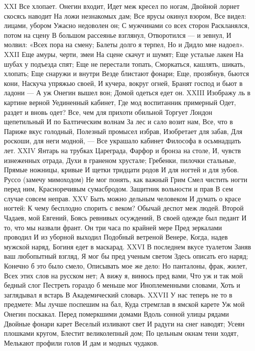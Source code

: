 XXI
Все хлопает. Онегин входит,
Идет меж кресел по ногам,
Двойной лорнет скосясь наводит
На ложи незнакомых дам;
Все ярусы окинул взором,
Все видел: лицами, убором
Ужасно недоволен он;
С мужчинами со всех сторон
Раскланялся, потом на сцену
В большом рассеянье взглянул,
Отворотился — и зевнул,
И молвил: «Всех пора на смену;
Балеты долго я терпел,
Но и Дидло мне надоел».
XXII
Еще амуры, черти, змеи
На сцене скачут и шумят;
Еще усталые лакеи
На шубах у подъезда спят;
Еще не перестали топать,
Сморкаться, кашлять, шикать, хлопать;
Еще снаружи и внутри
Везде блистают фонари;
Еще, прозябнув, бьются кони,
Наскуча упряжью своей,
И кучера, вокруг огней,
Бранят господ и бьют в ладони —
А уж Онегин вышел вон;
Домой одеться едет он.
XXIII
Изображу ль в картине верной
Уединенный кабинет,
Где мод воспитанник примерный
Одет, раздет и вновь одет?
Все, чем для прихоти обильной
Торгует Лондон щепетильный
И по Балтическим волнам
За лес и сало возит нам,
Все, что в Париже вкус голодный,
Полезный промысел избрав,
Изобретает для забав,
Для роскоши, для неги модной, —
Все украшало кабинет
Философа в осьмнадцать лет.
XXIV
Янтарь на трубках Цареграда,
Фарфор и бронза на столе,
И, чувств изнеженных отрада,
Духи в граненом хрустале;
Гребенки, пилочки стальные,
Прямые ножницы, кривые
И щетки тридцати родов
И для ногтей и для зубов.
Руссо (замечу мимоходом)
Не мог понять, как важный Грим
Смел чистить ногти перед ним,
Красноречивым сумасбродом.
Защитник вольности и прав
В сем случае совсем неправ.
XXV
Быть можно дельным человеком
И думать о красе ногтей:
К чему бесплодно спорить с веком?
Обычай деспот меж людей.
Второй Чадаев, мой Евгений,
Боясь ревнивых осуждений,
В своей одежде был педант
И то, что мы назвали франт.
Он три часа по крайней мере
Пред зеркалами проводил
И из уборной выходил
Подобный ветреной Венере,
Когда, надев мужской наряд,
Богиня едет в маскарад.
XXVI
В последнем вкусе туалетом
Заняв ваш любопытный взгляд,
Я мог бы пред ученым светом
Здесь описать его наряд;
Конечно б это было смело,
Описывать мое же дело:
Но панталоны, фрак, жилет,
Всех этих слов на русском нет;
А вижу я, винюсь пред вами,
Что уж и так мой бедный слог
Пестреть гораздо б меньше мог
Иноплеменными словами,
Хоть и заглядывал я встарь
В Академический словарь.
XXVII
У нас теперь не то в предмете:
Мы лучше поспешим на бал,
Куда стремглав в ямской карете
Уж мой Онегин поскакал.
Перед померкшими домами
Вдоль сонной улицы рядами
Двойные фонари карет
Веселый изливают свет
И радуги на снег наводят;
Усеян плошками кругом,
Блестит великолепный дом;
По цельным окнам тени ходят,
Мелькают профили голов
И дам и модных чудаков.
